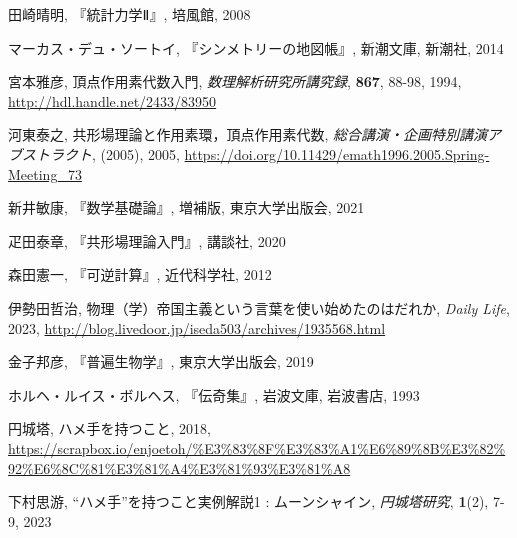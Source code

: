 \documentclass[10pt, a5paper, twoside]{jsarticle}
\theoremstyle{definition}
\begin{document}
\begin{thebibliography}{99}
		 田崎晴明, 『統計力学Ⅱ』, 培風館, 2008

		 マーカス・デュ・ソートイ, 『シンメトリーの地図帳』, 新潮文庫, 新潮社, 2014

		 宮本雅彦, 頂点作用素代数入門, \textit{数理解析研究所講究録}, \textbf{867}, 88-98, 1994, \url{http://hdl.handle.net/2433/83950}

		 河東泰之, 共形場理論と作用素環，頂点作用素代数, \textit{総合講演・企画特別講演アブストラクト}, (2005), 2005, \url{https://doi.org/10.11429/emath1996.2005.Spring-Meeting_73}

		 新井敏康, 『数学基礎論』, 増補版, 東京大学出版会, 2021

		 疋田泰章, 『共形場理論入門』, 講談社, 2020

		 森田憲一, 『可逆計算』, 近代科学社, 2012

		 伊勢田哲治, 物理（学）帝国主義という言葉を使い始めたのはだれか, \textit{Daily Life}, 2023, \url{http://blog.livedoor.jp/iseda503/archives/1935568.html}

		 金子邦彦, 『普遍生物学』, 東京大学出版会, 2019

		 ホルヘ・ルイス・ボルヘス, 『伝奇集』, 岩波文庫, 岩波書店, 1993

		 円城塔, ハメ手を持つこと, 2018, \url{https://scrapbox.io/enjoetoh/%E3%83%8F%E3%83%A1%E6%89%8B%E3%82%92%E6%8C%81%E3%81%A4%E3%81%93%E3%81%A8}

		 下村思游, “ハメ手”を持つこと実例解説1 : ムーンシャイン, \textit{円城塔研究}, \textbf{1}(2), 7-9, 2023

	\end{thebibliography}
\end{document}
